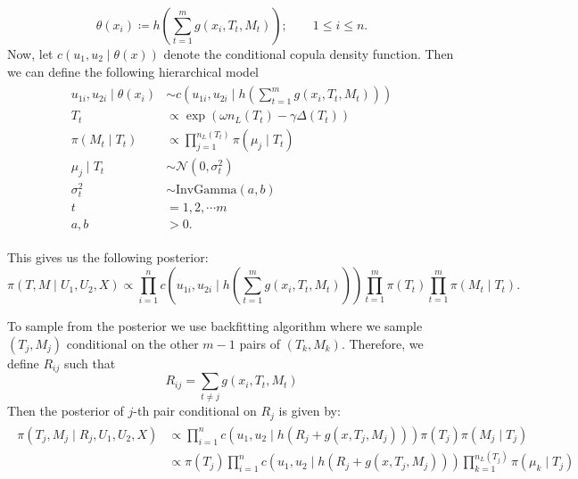 \documentclass{amsart}
\begin{document}
\begin{equation*}
	\theta(x_i) \coloneqq h\left(\sum_{t=1}^m g(x_i, T_t, M_t)\right);\qquad 1\le i\le n.
\end{equation*}
Now, let $c\left(u_1,u_2\mid \theta(x)\right)$ denote the conditional copula density function. Then we can define the following hierarchical model
\begin{align}
	\begin{split}
		u_{1i},u_{2i} \mid \theta(x_i) & \sim c\left(u_{1i},u_{2i}\mid h\left(\sum_{t=1}^m g(x_i, T_t, M_t)\right)\right)\\
		T_t &\propto \exp\left(\omega n_L(T_t)-\gamma\Delta(T_t)\right)\\
		\pi(M_t\mid T_t) &\propto \prod_{j=1}^{n_L(T_t)}\pi(\mu_j\mid T_t)\\
		\mu_j\mid T_t &\sim \mathcal{N}(0,\sigma_{t}^2)\\
		\sigma_{t}^2&\sim \text{InvGamma}(a,b)\\
		t & = 1,2,\cdots m\\
		a,b&>0.
	\end{split}
\end{align}

This gives us the following posterior:
\begin{equation}
	\pi(T,M \mid U_1, U_2, X) \propto \prod_{i=1}^{n}c\left(u_{1i},u_{2i}\mid h\left(\sum_{t=1}^m g(x_i, T_t, M_t)\right)\right)\prod_{t=1}^{m}\pi(T_t)\prod_{t=1}^{m}\pi(M_t\mid T_t).
\end{equation}

To sample from the posterior we use backfitting algorithm where we sample $(T_j, M_j)$ conditional on the other $m-1$ pairs of $(T_k,M_k)$. Therefore, we define $R_{ij}$ such that
\begin{equation*}
	R_{ij} = \sum_{t\not=j}g(x_i, T_t, M_t)
\end{equation*}
Then the posterior of $j$-th pair conditional on $R_j$ is given by:
\begin{align}\label{eq:post:res}
	\begin{split}
		\pi(T_j,M_j \mid R_j, U_1,U_2, X) &\propto \prod_{i=1}^{n}c\left(u_{1},u_{2}\mid h\left(R_j+g(x, T_j, M_j)\right)\right)\pi(T_j)\pi(M_j\mid T_j)\\
		&\propto \pi(T_j)\prod_{i=1}^{n}c\left(u_{1},u_{2}\mid h\left(R_j+g(x, T_j, M_j)\right)\right)\prod_{k=1}^{n_L(T_j)}\pi(\mu_k\mid T_j)
	\end{split}
\end{align}
\end{document}
